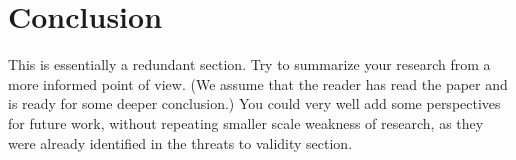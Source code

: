 \section{Conclusion}
\label{sec:conclusion}

This is essentially a redundant section. Try to summarize your
research from a more informed point of view. (We assume that the
reader has read the paper and is ready for some deeper conclusion.)
You could very well add some perspectives for future work, without
repeating smaller scale weakness of research, as they were already
identified in the threats to validity section.
